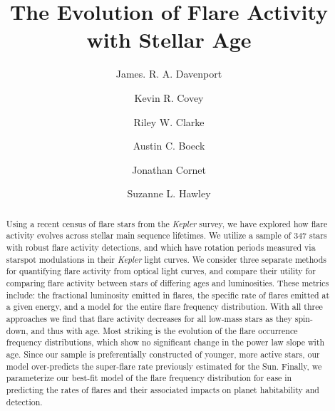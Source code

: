 \documentclass[preprint2]{aastex62}
\newcommand{\Kepler}{\textsl{Kepler}\xspace}
\begin{document}
\title{The Evolution of Flare Activity with Stellar Age}




\author{James. R. A. Davenport}

\author{Kevin R. Covey}

\author{Riley W. Clarke}

\author{Austin C. Boeck}

\author{Jonathan Cornet}

\author{Suzanne L. Hawley}

 

\begin{abstract}
Using a recent census of flare stars from the \Kepler survey, we have explored how flare activity evolves across stellar main sequence lifetimes. We utilize a sample of 347 stars with robust flare activity detections, and which have rotation periods measured via starspot modulations in their \Kepler light curves. 
We consider three separate methods for quantifying flare activity from optical light curves, and compare their utility for comparing flare activity between stars of differing ages and luminosities.
These metrics include: the fractional luminosity emitted in flares, the specific rate of flares emitted at a given energy, and a model for the entire flare frequency distribution. With all three approaches we find that flare activity decreases for all low-mass stars as they spin-down, and thus with age. 
Most striking is the evolution of the flare occurrence frequency distributions, which show no significant change in the power law slope with age. Since our sample is preferentially constructed of younger, more active stars, our model over-predicts the super-flare rate previously estimated for the Sun. 
Finally, we parameterize our best-fit model of the flare frequency distribution for ease in predicting the rates of flares and their associated impacts on planet habitability and detection. 
 \end{abstract}
\end{document}
